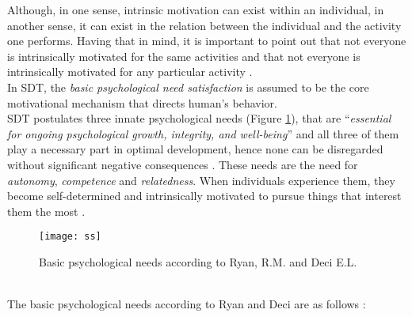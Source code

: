 Although, in one sense, intrinsic motivation can exist within an individual, in another sense, it can exist in the relation between the individual and the activity one performs. Having that in mind, it is important to point out that not everyone is intrinsically motivated for the same activities and that not everyone is intrinsically motivated for any particular activity \cite{ryan2000intrinsic}. \\In SDT, the \textit{basic psychological need satisfaction} is assumed to be the core motivational mechanism that directs human's behavior. \\SDT postulates three innate psychological needs (Figure \ref{fig:ss}), that are ``\textit{essential for ongoing psychological growth, integrity, and well-being}'' and all three of them play a necessary part in optimal development, hence none can be disregarded without significant negative consequences \cite{deci2000and}. These needs are the need for \textit{autonomy}, \textit{competence} and \textit{relatedness}. When individuals experience them, they become self-determined and intrinsically motivated to pursue things that interest them the most \cite{deci2000and}.
\begin{figure}[h]
    \centering
    \texttt{[image: ss]}
    \caption{Basic psychological needs according to Ryan, R.M. and Deci E.L. \cite{deci1994promoting} }
    \label{fig:ss}
\end{figure}\\
The basic psychological needs according to Ryan and Deci are as follows \cite{deci1994promoting}:
